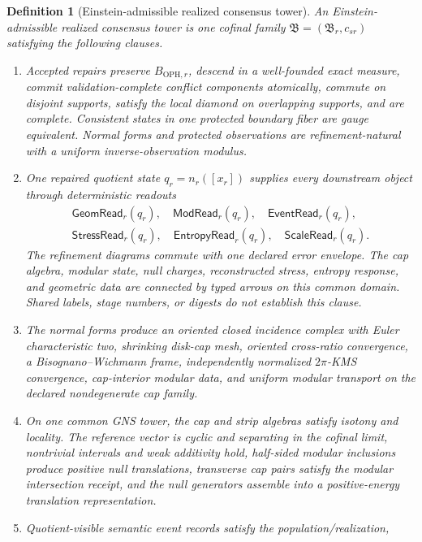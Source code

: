 \documentclass[11pt]{article}
\newtheorem{definition}[theorem]{Definition}
\begin{document}
\begin{definition}[Einstein-admissible realized consensus tower]
\label{def:einstein-admissible-realized-tower}
An Einstein-admissible realized consensus tower is one cofinal family
\(\mathfrak B=(\mathfrak B_r,c_{sr})\) satisfying the following clauses.
\begin{enumerate}[leftmargin=2em,label=\textup{EB\arabic*.}]
\item Accepted repairs preserve \(B_{\mathrm{OPH},r}\), descend in a
well-founded exact measure, commit validation-complete conflict components
atomically, commute on disjoint supports, satisfy the local diamond on
overlapping supports, and are complete. Consistent states in one protected
boundary fiber are gauge equivalent. Normal forms and protected observations
are refinement-natural with a uniform inverse-observation modulus.
\item One repaired quotient state \(q_r=n_r([x_r])\) supplies every downstream
object through deterministic readouts
\[
\begin{aligned}
\mathsf{GeomRead}_r(q_r),\quad
\mathsf{ModRead}_r(q_r),\quad
\mathsf{EventRead}_r(q_r),\\
\mathsf{StressRead}_r(q_r),\quad
\mathsf{EntropyRead}_r(q_r),\quad
\mathsf{ScaleRead}_r(q_r).
\end{aligned}
\]
The refinement diagrams commute with one declared error envelope. The cap
algebra, modular state, null charges, reconstructed stress, entropy response,
and geometric data are connected by typed arrows on this common domain.
Shared labels, stage numbers, or digests do not establish this clause.
\item The normal forms produce an oriented closed incidence complex with
Euler characteristic two, shrinking disk-cap mesh, oriented cross-ratio
convergence, a Bisognano--Wichmann frame, independently normalized
\(2\pi\)-KMS convergence, cap-interior modular data, and uniform modular
transport on the declared nondegenerate cap family.
\item On one common GNS tower, the cap and strip algebras satisfy isotony and
locality. The reference vector is cyclic and separating in the cofinal limit,
nontrivial intervals and weak additivity hold, half-sided modular inclusions
produce positive null translations, transverse cap pairs satisfy the modular
intersection receipt, and the null generators assemble into a positive-energy
translation representation.
\item Quotient-visible semantic event records satisfy the population/realization,

\end{enumerate}
\end{definition}
\end{document}
